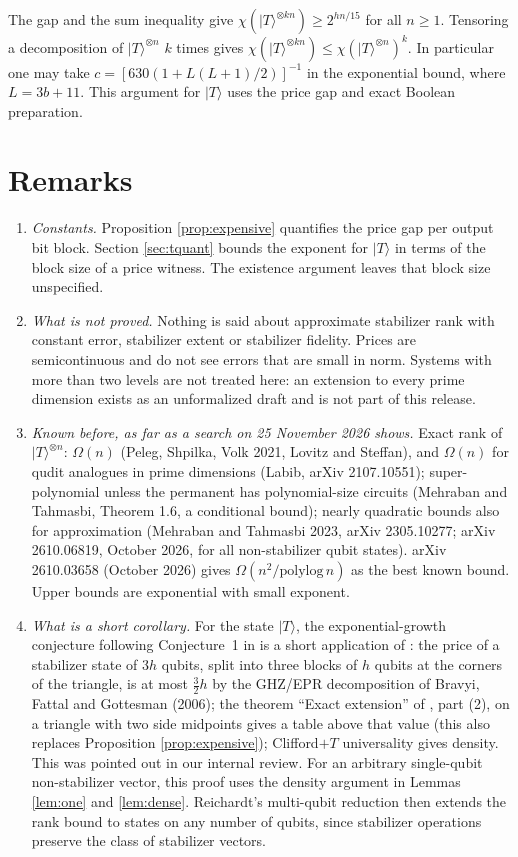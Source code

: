 \documentclass[11pt]{article}
\theoremstyle{definition}
\newcommand{\ket}[1]{|#1\rangle}
\begin{document}
The gap and the sum inequality give $\chi(\ket T^{\otimes k n})\ge 2^{hn/15}$ for all $n\ge1$.
Tensoring a decomposition of $\ket T^{\otimes n}$ $k$ times gives
$\chi(\ket T^{\otimes k n})\le \chi(\ket T^{\otimes n})^k$. In particular one may take
$c=[630(1+L(L+1)/2)]^{-1}$ in the exponential bound, where $L=3b+11$.
This argument for $\ket T$ uses the price gap and exact Boolean preparation.

\section{Remarks}
\begin{enumerate}
\item \emph{Constants.} Proposition \ref{prop:expensive} quantifies the price gap per output bit block. Section \ref{sec:tquant} bounds the exponent for $\ket T$ in terms of the block size of a price witness. The existence argument leaves that block size unspecified.
\item \emph{What is not proved.} Nothing is said about approximate stabilizer rank with constant error, stabilizer extent or stabilizer fidelity. Prices are semicontinuous and do not see errors that are small in norm. Systems with more than two levels are not treated here: an extension to every prime dimension exists as an unformalized draft and is not part of this release.
\item \emph{Known before, as far as a search on 25 November 2026 shows.} Exact rank of $\ket T^{\otimes n}$: $\Omega(n)$ (Peleg, Shpilka, Volk 2021, Lovitz and Steffan), and $\Omega(n)$ for qudit analogues in prime dimensions (Labib, arXiv 2107.10551); super-polynomial unless the permanent has polynomial-size circuits (Mehraban and Tahmasbi, Theorem 1.6, a conditional bound); nearly quadratic bounds also for approximation (Mehraban and Tahmasbi 2023, arXiv 2305.10277; arXiv 2610.06819, October 2026, for all non-stabilizer qubit states). arXiv 2610.03658 (October 2026) gives $\Omega(n^2/\mathrm{polylog}\,n)$ as the best known bound. Upper bounds are exponential with small exponent.
\item \emph{What is a short corollary.} For the state $\ket T$, the exponential-growth conjecture following Conjecture~1 in \cite{BSS} is a short application of \cite{EG}: the price of a stabilizer state of $3h$ qubits, split into three blocks of $h$ qubits at the corners of the triangle, is at most $\frac32h$ by the GHZ/EPR decomposition of Bravyi, Fattal and Gottesman (2006); the theorem ``Exact extension'' of \cite{EG}, part (2), on a triangle with two side midpoints gives a table above that value (this also replaces Proposition \ref{prop:expensive}); Clifford$+T$ universality gives density. This was pointed out in our internal review. For an arbitrary single-qubit non-stabilizer vector, this proof uses the density argument in Lemmas \ref{lem:one} and \ref{lem:dense}. Reichardt's multi-qubit reduction \cite[Appendix B]{Reichardt} then extends the rank bound to states on any number of qubits, since stabilizer operations preserve the class of stabilizer vectors.

\end{enumerate}
\end{document}
